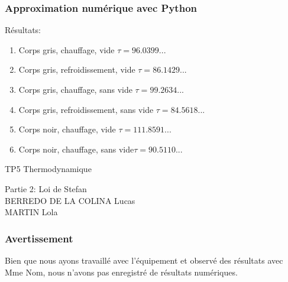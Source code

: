 \documentclass{beamer}
\begin{document}
\begin{frame}
\frametitle{Approximation numérique avec Python}
Résultats:
\begin{enumerate}
	\item{{\color{gray7}Corps gris}{\color{gray4}, {\color{red}chauffage}, vide} \hfill $\tau = 96.0399...$\hspace{4em} \newline}
	\item{{\color{gray7}Corps gris}{\color{gray4}, {\color{blue5}refroidissement}, vide} \hfill $\tau = 86.1429...$\hspace{4em} \newline}
	\item{{\color{gray7}Corps gris}{\color{gray4}, {\color{red}chauffage}, sans vide} \hfill $\tau = 99.2634...$\hspace{4em} \newline}
	\item{{\color{gray7}Corps gris}{\color{gray4}, {\color{blue5}refroidissement}, sans vide} \hfill $\tau = 84.5618...$\hspace{4em} \newline}
	\item{{\color{black}Corps noir}{\color{gray4}, {\color{red}chauffage}, vide} \hfill $\tau = 111.8591...$\hspace{4em} \newline}
	\item{{\color{black}Corps noir}{\color{gray4}, {\color{red}chauffage}, sans vide}\hfill $\tau = 90.5110...$\hspace{4em} \newline}
\end{enumerate}
\end{frame}





\begin{frame}

\Huge{TP5 Thermodynamique}

\Large{Partie 2: Loi de Stefan}
\\[2em]
\large{BERREDO DE LA COLINA Lucas\\ MARTIN Lola}

\end{frame}





\begin{frame}
\frametitle{Avertissement}
Bien que nous ayons travaillé avec l'équipement et observé des résultats avec {\color{red} Mme Nom}, nous n'avons pas enregistré de résultats numériques.
\end{frame}
\end{document}
